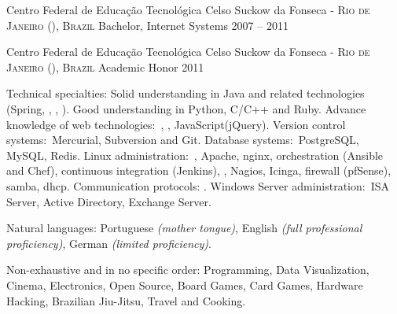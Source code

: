 \documentclass[10pt,a4paper]{article}
\begin{document}
\headedsection
  {Centro Federal de Educação Tecnológica Celso Suckow da Fonseca - }
  {\textsc{Rio de Janeiro (), Brazil}} {%
  \headedsubsection
    {Bachelor, Internet Systems}
    {2007 -- 2011}
    {
    }
  }

\spacedhrule{0.5em}{-0.4em}


\headedsection
  {Centro Federal de Educação Tecnológica Celso Suckow da Fonseca - }
  {\textsc{Rio de Janeiro (), Brazil}} {%
  \headedsubsection
    {Academic Honor}
    {2011}
    {
    }
  }

\spacedhrule{1.6em}{-0.4em}

  
{
}

\spacedhrule{0.5em}{-0.4em}


\inlineheadsection  %
  {Technical specialties:}
  {Solid understanding in Java and related technologies (Spring, , , ). Good understanding in Python, C/C++ and Ruby. Advance knowledge of web technologies:\ , , JavaScript(jQuery). Version control systems:\ Mercurial, Subversion and Git. Database systems:\ PostgreSQL, MySQL, Redis. Linux administration:\ , Apache, nginx, orchestration (Ansible and Chef), continuous integration (Jenkins), , Nagios, Icinga, firewall (pfSense), samba, dhcp. Communication protocols: . Windows Server administration:\ ISA Server, Active Directory, Exchange Server.
  }

\inlineheadsection
  {Natural languages:}
  {Portuguese \emph{(mother tongue)}, English \emph{(full professional proficiency)}, German \emph{(limited proficiency)}.}

\spacedhrule{1.6em}{-0.4em}


\inlineheadsection
  {Non-exhaustive and in no specific order:}
  {Programming, Data Visualization, Cinema, Electronics, Open Source, Board Games, Card Games, Hardware Hacking, Brazilian Jiu-Jitsu, Travel and Cooking.}
\end{document}
